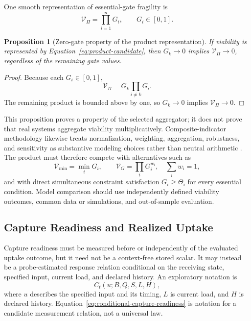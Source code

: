 \documentclass[11pt]{article}
\newtheorem{proposition}{Proposition}
\newcommand{\V}{\mathcal{V}}
\begin{document}
One smooth representation of essential-gate fragility is
\begin{equation}
    \V_{\Pi}
    =
    \prod_{i=1}^{n}G_i,
    \qquad G_i\in[0,1].
    \label{eq:product-candidate}
\end{equation}

\begin{proposition}[Zero-gate property of the product representation]
If viability is represented by Equation~\eqref{eq:product-candidate}, then \(G_k\to0\) implies \(\V_{\Pi}\to0\), regardless of the remaining gate values.
\end{proposition}

\begin{proof}
Because each \(G_i\in[0,1]\),
\[
    \V_{\Pi}
    =
    G_k\prod_{i\neq k}G_i.
\]
The remaining product is bounded above by one, so \(G_k\to0\) implies \(\V_{\Pi}\to0\).
\end{proof}

This proposition proves a property of the selected aggregator; it does not prove that real systems aggregate viability multiplicatively. Composite-indicator methodology likewise treats normalization, weighting, aggregation, robustness, and sensitivity as substantive modeling choices rather than neutral arithmetic \cite{oecd2008}. The product must therefore compete with alternatives such as
\begin{equation}
    \V_{\min}=\min_i G_i,
    \qquad
    \V_G=\prod_i G_i^{w_i},\quad \sum_iw_i=1,
\end{equation}
and with direct simultaneous constraint satisfaction \(G_i\geq\Theta_i\) for every essential condition. Model comparison should use independently defined viability outcomes, common data or simulations, and out-of-sample evaluation.

\subsection{Capture Readiness and Realized Uptake}

Capture readiness must be measured before or independently of the evaluated uptake outcome, but it need not be a context-free stored scalar. It may instead be a probe-estimated response relation conditional on the receiving state, specified input, current load, and declared history. An exploratory notation is
\begin{equation}
    C_t\!\left(u;B,Q,S,L,H\right),
    \label{eq:conditional-capture-readiness}
\end{equation}
where \(u\) describes the specified input and its timing, \(L\) is current load, and \(H\) is declared history. Equation~\eqref{eq:conditional-capture-readiness} is notation for a candidate measurement relation, not a universal law.
\end{document}
